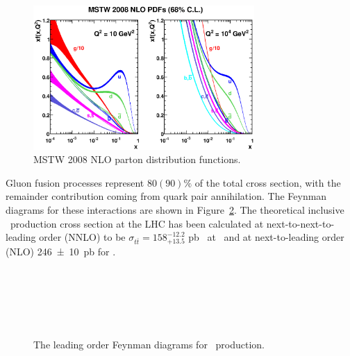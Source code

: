 \begin{figure}[htbp]
  \centering
    \includegraphics[width=0.75\textwidth]{PartTopQuark/Plots/mstw2008nlo68cl_allpdfs.eps}
    \caption{MSTW 2008 NLO parton distribution functions.}\label{fig:TopMSTWNLOPDFs}
\end{figure}

Gluon fusion processes represent $\num{80}(\num{90})\si{\percent}$ of the total cross section, with the remainder contribution coming from quark pair annihilation. The Feynman diagrams for these interactions are shown in Figure~\ref{fig:TopQuarkProduction}. The theoretical inclusive \ttbar\ production cross section at the LHC has been calculated at next-to-next-to-leading order (NNLO) to be $\sigma_{t\bar{t}}=158^{-12.2}_{+13.5}$ \si{\pico\barn}~\cite{TopPair} at \cmsS\ and at next-to-leading order (NLO) \SI{246(10)}{\pico\barn} for \cmsE.
%
\begin{figure}[htbp]
  \centering
  \begin{minipage}[][][t]{.47\textwidth}
    \centering
    
  \end{minipage}
  \,
  \begin{minipage}[][][t]{.47\textwidth}
    \centering
    
  \end{minipage}
  
  \begin{minipage}[][][t]{.47\textwidth}
    \centering
    
  \end{minipage}
  \,
  \begin{minipage}[][][t]{.47\textwidth}
    \centering
    
  \end{minipage}
  \,
  \caption{The leading order Feynman diagrams for \ttbar\ production.}\label{fig:TopQuarkProduction}
\end{figure}

